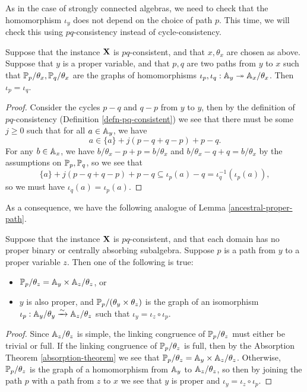 \documentclass[letterpaper,11pt]{article}
\begin{document}
As in the case of strongly connected algebras, we need to check that the homomorphism $\iota_y$ does not depend on the choice of path $p$. This time, we will check this using $pq$-consistency instead of cycle-consistency.

\begin{lem} Suppose that the instance $\mathbf{X}$ is $pq$-consistent, and that $x, \theta_x$ are chosen as above. Suppose that $y$ is a proper variable, and that $p,q$ are two paths from $y$ to $x$ such that $\mathbb{P}_p/\theta_x, \mathbb{P}_q/\theta_x$ are the graphs of homomorphisms $\iota_p, \iota_q: \mathbb{A}_y \twoheadrightarrow \mathbb{A}_x/\theta_x$. Then $\iota_p = \iota_q$.
\end{lem}
\begin{proof} Consider the cycles $p-q$ and $q-p$ from $y$ to $y$, then by the definition of $pq$-consistency (Definition \ref{defn-pq-consistent}) we see that there must be some $j \ge 0$ such that for all $a \in \mathbb{A}_y$, we have
\[
a \in \{a\} + j(p-q + q-p) + p-q.
\]
For any $b \in \mathbb{A}_x$, we have $b/\theta_x - p + p = b/\theta_x$ and $b/\theta_x - q + q = b/\theta_x$ by the assumptions on $\mathbb{P}_p, \mathbb{P}_q$, so we see that
\[
\{a\} + j(p-q + q-p) + p-q \subseteq \iota_p(a) - q = \iota_q^{-1}(\iota_p(a)),
\]
so we must have $\iota_q(a) = \iota_p(a)$.
\end{proof}

As a consequence, we have the following analogue of Lemma \ref{ancestral-proper-path}.

\begin{lem}\label{proper-path} Suppose that the instance $\mathbf{X}$ is $pq$-consistent, and that each domain has no proper binary or centrally absorbing subalgebra. Suppose $p$ is a path from $y$ to a proper variable $z$. Then one of the following is true:
\begin{itemize}
\item $\mathbb{P}_p/\theta_z = \mathbb{A}_y \times \mathbb{A}_z/\theta_z$, or

\item $y$ is also proper, and $\mathbb{P}_p/(\theta_y\times\theta_z)$ is the graph of an isomorphism $\iota_p : \mathbb{A}_y/\theta_y \xrightarrow{\sim} \mathbb{A}_z/\theta_z$ such that $\iota_y = \iota_z \circ \iota_p$.
\end{itemize}
\end{lem}
\begin{proof} Since $\mathbb{A}_z/\theta_z$ is simple, the linking congruence of $\mathbb{P}_p/\theta_z$ must either be trivial or full. If the linking congruence of $\mathbb{P}_p/\theta_z$ is full, then by the Absorption Theorem \ref{absorption-theorem} we see that $\mathbb{P}_p/\theta_z = \mathbb{A}_y \times \mathbb{A}_z/\theta_z$. Otherwise, $\mathbb{P}_p/\theta_z$ is the graph of a homomorphism from $\mathbb{A}_y$ to $\mathbb{A}_z/\theta_z$, so then by joining the path $p$ with a path from $z$ to $x$ we see that $y$ is proper and $\iota_y = \iota_z \circ \iota_p$.
\end{proof}
\end{document}
